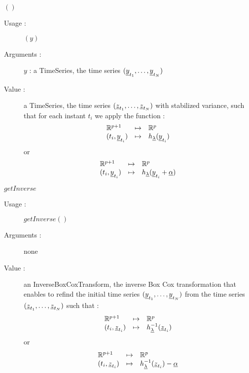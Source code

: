 \begin{description}
\begin{description}
   \item $()$
    \begin{description}
    \item[Usage :] $(y)$
    \item[Arguments :] $y$ : a TimeSeries, the time series $({\underline{y}}_{t_1}, \dots,{\underline{y}}_{t_N})$
    \item[Value :]   a TimeSeries, the time series $({\underline{z}}_{t_1}, \dots,{\underline{z}}_{t_N})$  with stabilized variance, such that for each instant $t_i$ we apply the function : 
\begin{equation}
\begin{array}{lcl}\label{Eval}
  \mathbb{R}^{p+1} & \mapsto & \mathbb{R}^{p} \\
  (t_i,{\underline{y}}_{t_i}) & \mapsto & h_{{\underline{\lambda}}}({\underline{y}}_{t_i})
\end{array}
\end{equation}
or 
\begin{equation}
\begin{array}{lcl}\label{Eval}
  \mathbb{R}^{p+1} & \mapsto & \mathbb{R}^{p} \\
  (t_i,{\underline{y}}_{t_i})  & \mapsto & h_{{\underline{\lambda}}}({\underline{y}}_{t_i} + {\underline{\alpha}})
\end{array}
\end{equation}
    \end{description}
    \bigskip

   \item $getInverse$
    \begin{description}
    \item[Usage :] $getInverse()$
    \item[Arguments :] none
    \item[Value :]   an InverseBoxCoxTransform, the inverse Box Cox transformation that enables to refind the initial time series $({\underline{y}}_{t_1}, \dots,{\underline{y}}_{t_N})$ from the time series $({\underline{z}}_{t_1}, \dots,{\underline{z}}_{t_N})$ such that : 
\begin{equation}
\begin{array}{lcl}\label{Inverse}
  \mathbb{R}^{p+1} & \mapsto & \mathbb{R}^{p} \\
  (t_i,{\underline{z}}_{t_i}) & \mapsto & h^{-1}_{{\underline{\lambda}}}({\underline{z}}_{t_i} )
\end{array}
\end{equation}
or 
\begin{equation}
\begin{array}{lcl}\label{Eval}
  \mathbb{R}^{p+1} & \mapsto & \mathbb{R}^{p} \\
  (t_i,{\underline{z}}_{t_i}) & \mapsto & h^{-1}_{{\underline{\lambda}}}({\underline{z}}_{t_i} ) - {\underline{\alpha}}
\end{array}
\end{equation}
    \end{description}
    \bigskip


\end{description}
\end{description}
